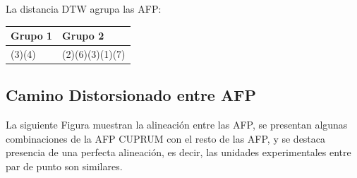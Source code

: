 La distancia DTW agrupa las AFP:

\begin{tabular}{|l|l|}
\hline
Grupo 1 & Grupo 2 \\
\hline
(3)(4) & (2)(6)(3)(1)(7) \\
\hline
\end{tabular}

\subsection{Camino Distorsionado entre AFP}
La siguiente Figura muestran la alineaci\'on entre las AFP, se presentan algunas combinaciones de la AFP CUPRUM con el resto de las AFP, y se destaca presencia de una perfecta alineaci\'on, es decir, las unidades ex\-pe\-ri\-men\-ta\-les entre par de punto son similares.

